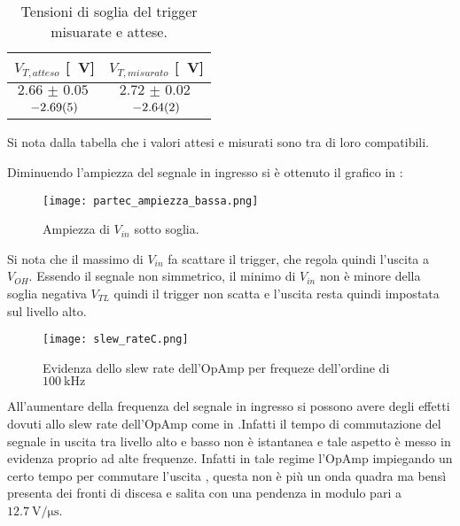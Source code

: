 \begin{table}[h]
	\centering
	\begin{tabular}{ *{2}{S[table-figures-exponent = 2]} } 
		{$V_{T,atteso}$ [\SI{}{\V}]} & {$V_{T,misurato}$ [\SI{}{\V}]} \\
		\midrule 
		 $\SI{2.66(5)}{}$	&	$\SI{2.72(2)}{}$	\\ 
		$\SI{-2.69 (5)}{}$	&	$\SI{-2.64 (2)}{}$	\\ 
	\end{tabular} 
	\caption{Tensioni di soglia del trigger misuarate e attese.} 
	\label{t:trigg_soglia} 
\end{table}
Si nota dalla tabella che i valori attesi e misurati sono tra di loro compatibili.

Diminuendo l'ampiezza del segnale in ingresso si è ottenuto il grafico in :
\begin{figure}[h]
	\centering
	\texttt{[image: partec\_ampiezza\_bassa.png]}
	\caption{Ampiezza di $V_{in}$ sotto soglia. }
	\label{f:sotto_soglia}
\end{figure}

Si nota che il massimo di $V_{in}$ fa scattare il trigger, che regola quindi l'uscita a $V_{OH}$. Essendo il segnale non simmetrico, il minimo di $V_{in}$ non è minore della soglia negativa $V_{TL}$ quindi il trigger non scatta e l'uscita resta quindi impostata sul livello alto.

\begin{figure}[h]
	\centering
	\texttt{[image: slew\_rateC.png]}
	\caption{Evidenza dello slew rate dell'OpAmp per frequeze dell'ordine di $\SI{100}{\kHz}$}
	\label{f:slew_rate}
\end{figure}

All'aumentare della frequenza del segnale in ingresso si possono avere degli effetti dovuti allo slew rate dell'OpAmp come in .Infatti il tempo di commutazione del segnale in uscita tra livello alto e basso non è istantanea e tale aspetto è messo in evidenza proprio ad alte frequenze. Infatti in tale regime l'OpAmp impiegando un certo tempo per commutare l'uscita , questa non è più un onda quadra ma bensì presenta dei fronti di discesa e salita con una pendenza in modulo pari a $\SI{12.7}{\volt\per\micro\s}$.


